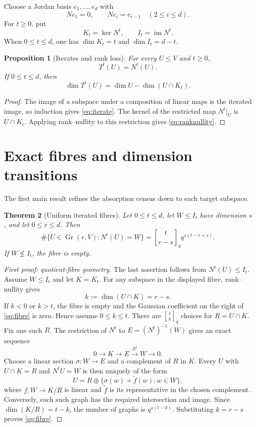 \documentclass[11pt,a4paper]{amsart}
\newcommand{\Gr}{\operatorname{Gr}}
\newcommand{\im}{\operatorname{im}}
\newcommand{\qbinom}[2]{\genfrac{[}{]}{0pt}{}{#1}{#2}_{q}}
\newtheorem{theorem}{Theorem}[section]
\newtheorem{proposition}[theorem]{Proposition}
\begin{document}
Choose a Jordan basis $e_1,\ldots,e_d$ with
\[
 Ne_1=0,\qquad Ne_i=e_{i-1}\quad(2\leq i\leq d).
\]
For $t\geq0$, put
\[
 K_t=\ker N^t,\qquad I_t=\im N^t.
\]
When $0\leq t\leq d$, one has $\dim K_t=t$ and $\dim I_t=d-t$.

\begin{proposition}[Iterates and rank loss]
\label{prop:iterate}
For every $U\leq V$ and $t\geq0$,
\begin{equation}
 \label{eq:iterate}
 T^t(U)=N^t(U).
\end{equation}
If $0\leq t\leq d$, then
\begin{equation}
 \label{eq:ranknullity}
 \dim T^t(U)=\dim U-\dim(U\cap K_t).
\end{equation}
\end{proposition}

\begin{proof}
The image of a subspace under a composition of linear maps is the iterated
image, so induction gives \eqref{eq:iterate}.  The kernel of the restricted
map $N^t|_U$ is $U\cap K_t$.  Applying rank--nullity to this restriction
gives \eqref{eq:ranknullity}.
\end{proof}

\section{Exact fibres and dimension transitions}

The first main result refines the absorption census down to each target
subspace.

\begin{theorem}[Uniform iterated fibres]
\label{thm:fibre}
Let $0\leq t\leq d$, let $W\leq I_t$ have dimension $s$, and let
$0\leq r\leq d$.  Then
\begin{equation}
 \label{eq:fibre}
 \#\{U\in\Gr(r,V):N^t(U)=W\}
 =\qbinom{t}{r-s}q^{s(t-r+s)}.
\end{equation}
If $W\nleq I_t$, the fibre is empty.
\end{theorem}

\begin{proof}[First proof: quotient-fibre geometry]
The last assertion follows from $N^t(U)\leq I_t$.  Assume $W\leq I_t$ and
let $K=K_t$.  For any subspace in the displayed fibre, rank--nullity gives
\[
 k:=\dim(U\cap K)=r-s.
\]
If $k<0$ or $k>t$, the fibre is empty and the Gaussian coefficient on the
right of \eqref{eq:fibre} is zero.  Hence assume $0\leq k\leq t$.
There are $\qbinom{t}{k}$ choices for $R=U\cap K$.  Fix one such $R$.
The restriction of $N^t$ to $E=(N^t)^{-1}(W)$ gives an exact sequence
\[
 0\longrightarrow K\longrightarrow E\xrightarrow{N^t}W\longrightarrow0.
\]
Choose a linear section $\sigma\colon W\to E$ and a complement of $R$ in
$K$.  Every $U$ with $U\cap K=R$ and $N^tU=W$ is then uniquely of the form
\[
 U=R\oplus\{\sigma(w)+\widetilde f(w):w\in W\},
\]
where $f\colon W\to K/R$ is linear and $\widetilde f$ is its representative
in the chosen complement.  Conversely, each such graph has the required
intersection and image.  Since $\dim(K/R)=t-k$, the number of graphs is
$q^{s(t-k)}$.  Substituting $k=r-s$ proves \eqref{eq:fibre}.
\end{proof}
\end{document}
